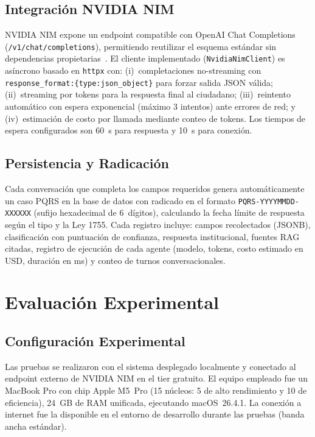 \documentclass[runningheads]{llncs}
\begin{document}
\subsection{Integración NVIDIA NIM}

NVIDIA NIM expone un endpoint compatible con OpenAI Chat Completions (\texttt{/v1/chat/completions}), permitiendo reutilizar el esquema estándar sin dependencias propietarias~\cite{nvidianim}. El cliente implementado (\texttt{NvidiaNimClient}) es asíncrono basado en \texttt{httpx} con: (i)~completaciones no-streaming con \texttt{response\_format:\{type:json\_object\}} para forzar salida JSON válida; (ii)~streaming por tokens para la respuesta final al ciudadano; (iii)~reintento automático con espera exponencial (máximo 3 intentos) ante errores de red; y (iv)~estimación de costo por llamada mediante conteo de tokens. Los tiempos de espera configurados son 60~s para respuesta y 10~s para conexión.

\subsection{Persistencia y Radicación}

Cada conversación que completa los campos requeridos genera automáticamente un caso PQRS en la base de datos con radicado en el formato \texttt{PQRS-YYYYMMDD-XXXXXX} (sufijo hexadecimal de 6~dígitos), calculando la fecha límite de respuesta según el tipo y la Ley 1755. Cada registro incluye: campos recolectados (JSONB), clasificación con puntuación de confianza, respuesta institucional, fuentes RAG citadas, registro de ejecución de cada agente (modelo, tokens, costo estimado en USD, duración en ms) y conteo de turnos conversacionales.

\section{Evaluación Experimental}
\label{sec:eval}

\subsection{Configuración Experimental}

Las pruebas se realizaron con el sistema desplegado localmente y conectado al endpoint externo de NVIDIA NIM en el tier gratuito. El equipo empleado fue un MacBook Pro con chip Apple M5~Pro (15 núcleos: 5 de alto rendimiento y 10 de eficiencia), 24~GB de RAM unificada, ejecutando macOS~26.4.1. La conexión a internet fue la disponible en el entorno de desarrollo durante las pruebas (banda ancha estándar).
\end{document}
